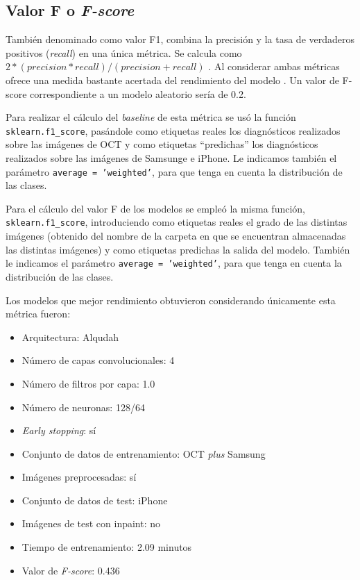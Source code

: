 \subsection{Valor F o \textit{F-score}}

También denominado como valor F1, combina la precisión y la tasa de verdaderos positivos (\textit{recall}) en una única métrica. Se calcula como $2*(precision*recall)/(precision+recall)$ \cite{sklearn:fscore}. Al considerar ambas métricas ofrece una medida bastante acertada del rendimiento del modelo \cite{metrics:inbal}. Un valor de F-score correspondiente a un modelo aleatorio sería de 0.2.

Para realizar el cálculo del \textit{baseline} de esta métrica se usó la función \texttt{sklearn.f1\_score}, pasándole como etiquetas reales los diagnósticos realizados sobre las imágenes de OCT y como etiquetas ``predichas'' los diagnósticos realizados sobre las imágenes de Samsunge e iPhone. Le indicamos también el parámetro \texttt{average = 'weighted'}, para que tenga en cuenta la distribución de las clases.

Para el cálculo del valor F de los modelos se empleó la misma función, \texttt{sklearn.f1\_score}, introduciendo como etiquetas reales el grado de las distintas imágenes (obtenido del nombre de la carpeta en que se encuentran almacenadas las distintas imágenes) y como etiquetas predichas la salida del modelo. También le indicamos el parámetro \texttt{average = 'weighted'}, para que tenga en cuenta la distribución de las clases.

Los modelos que mejor rendimiento obtuvieron considerando únicamente esta métrica fueron:

\begin{itemize}
    \item Arquitectura: Alqudah
    \item Número de capas convolucionales: 4
    \item Número de filtros por capa: 1.0
    \item Número de neuronas: 128/64
    \item \textit{Early stopping}: sí
    \item Conjunto de datos de entrenamiento: OCT \textit{plus} Samsung
    \item Imágenes preprocesadas: sí
    \item Conjunto de datos de test: iPhone
    \item Imágenes de test con inpaint: no
    \item Tiempo de entrenamiento: 2.09 minutos
    \item Valor de \textit{F-score}: 0.436
\end{itemize}

